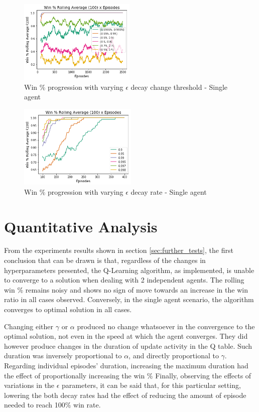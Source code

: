 \documentclass[11pt]{article}
\begin{document}
        \begin{figure}[h]
            \includegraphics[height=4cm]{Images/exp_6/1_change.png}
            \caption{Win \% progression with varying $\epsilon$ decay change threshold  - Single agent}
            \label{fig:exp6:change}
        \end{figure}

        \begin{figure}[h]
            \includegraphics[height=4cm]{Images/exp_6/2_threshold.png}
            \caption{Win \% progression with varying $\epsilon$ decay rate - Single agent}
            \label{fig:exp5:threshold}
        \end{figure}


\section{Quantitative Analysis}\label{sec:quant_analysis}
    From the experiments results shown in section \ref{sec:further_tests}, the first conclusion that can be drawn is that, regardless of the changes in hyperparameters presented, the Q-Learning algorithm, as implemented, is unable to converge to a solution when dealing with 2 independent agents. The rolling win \% remains noisy and shows no sign of move towards an increase in the win ratio in all cases observed. Conversely, in the single agent scenario, the algorithm converges to optimal solution in all cases.

    Changing either $\gamma$ or $\alpha$ produced no change whatsoever in the convergence to the optimal solution, not even in the speed at which the agent converges. They did however produce changes in the duration of update activity in the Q table. Such duration was inversely proportional to $\alpha$, and directly proportional to $\gamma$.
    Regarding individual episodes' duration, increasing the maximum duration had the effect of proportionally increasing the win \%
    Finally, observing the effects of variations in the $\epsilon$ parameters, it can be said that, for this particular setting, lowering the both decay rates had the effect of reducing the amount of episode needed to reach 100\% win rate.
\end{document}
